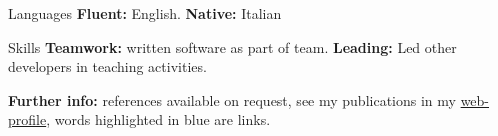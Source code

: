 
\begin{cvskills}

\cvskill
{Languages}
{\textbf{Fluent:} English. \textbf{Native:} Italian}

\cvskill
{Skills}
{\textbf{Teamwork:} written software as part of team. \textbf{Leading:} Led 
other developers in teaching activities.}

\end{cvskills}

\vspace{-2mm}
\flushleft
\footnotesize
\item {\color{awesome-red}\textbf{Fur}}{\color{awesome-darknight}\textbf{ther 
info:}} references available on request, see my publications in my 
{\color{myblue}\href{https://www.ncl.ac.uk/engineering/staff/profile/alessandrode-gennaro.html}{web-profile}},
words highlighted in {\color{myblue}blue} are links.